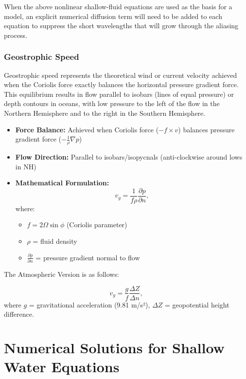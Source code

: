 \documentclass{article}
\begin{document}
When the above nonlinear shallow-fluid equations are used as the basis for a model, an explicit numerical diffusion term will need to be added to each equation to suppress the short wavelengths that will grow through the aliasing process.


\subsubsection{Geostrophic Speed}
Geostrophic speed represents the theoretical wind or current velocity achieved when the Coriolis force exactly balances the horizontal pressure gradient force. This equilibrium results in flow parallel to isobars (lines of equal pressure) or depth contours in oceans, with low pressure to the left of the flow in the Northern Hemisphere and to the right in the Southern Hemisphere.

\begin{itemize}
    \item \textbf{Force Balance:} Achieved when Coriolis force ($-f \times v$) balances pressure gradient force ($-\frac{1}{\rho}\nabla p$)
    
    \item \textbf{Flow Direction:} Parallel to isobars/isopycnals (anti-clockwise around lows in NH)
    
    \item \textbf{Mathematical Formulation:}
    \begin{equation}
        v_g = \frac{1}{f \rho} \frac{\partial p}{\partial n},
        \label{eq:58}
    \end{equation}
    where:
    \begin{itemize}
        \item $f = 2\Omega\sin\phi$ (Coriolis parameter)
        \item $\rho$ = fluid density
        \item $\frac{\partial p}{\partial n}$ = pressure gradient normal to flow
    \end{itemize}
\end{itemize}
The Atmospheric Version is as follows:

\begin{equation}
    v_g = \frac{g}{f} \frac{\Delta Z}{\Delta n},
    \label{eq:59}
\end{equation}
where $g$ = gravitational acceleration (9.81 m/s²), $\Delta Z$ = geopotential height difference.


\section{Numerical Solutions for Shallow Water Equations}
\end{document}
